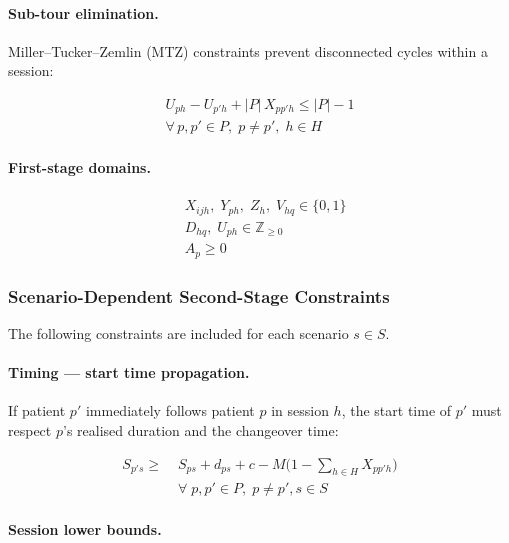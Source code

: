 \paragraph{Sub-tour elimination.}

Miller--Tucker--Zemlin (MTZ) constraints prevent disconnected cycles within a
session:

\begin{align}
  U_{ph} - U_{p'h} + |P|\, X_{pp'h} \leq |P| - 1 \nonumber \\
  \forall\, p,p' \in P,\; p \neq p',\; h \in H
  \label{eq:mtz}
\end{align}

\paragraph{First-stage domains.}

\begin{align}
  & X_{ijh},\; Y_{ph},\; Z_h,\; V_{hq} \in \{0,1\}
  \label{eq:dom_bin} \\[2pt]
  & D_{hq},\; U_{ph} \in \mathbb{Z}_{\geq 0}
  \qquad
  \label{eq:dom_viol} \\[2pt]
  & A_p \geq 0
  \label{eq:dom_appt}
\end{align}

\subsubsection{Scenario-Dependent Second-Stage Constraints}

The following constraints are included for each scenario $s \in S$.

\paragraph{Timing --- start time propagation.}

If patient $p'$ immediately follows patient $p$ in session $h$, the start time
of $p'$ must respect $p$'s realised duration and the changeover time:

\begin{align}
  S_{p's} \geq\; & S_{ps} + d_{ps} + c - M\bigl(1 - \sum_{h \in H} X_{pp'h}\bigr)
  \nonumber \\
                 & \forall\; p, p' \in P,\; p \neq p', s \in S
  \label{eq:time_seq}
\end{align}

\paragraph{Session lower bounds.}

